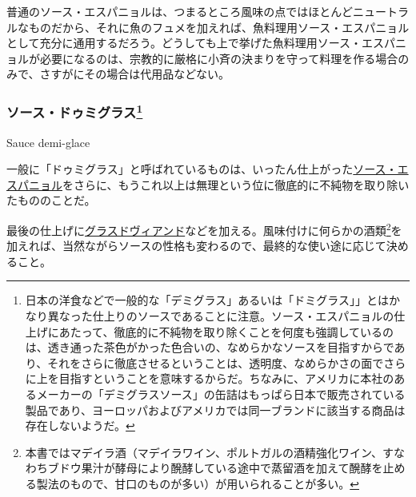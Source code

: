 \begin{recette}
普通のソース・エスパニョルは、つまるところ風味の点ではほとんどニュートラルなものだから、それに魚のフュメを加えれば、魚料理用ソース・エスパニョルとして充分に通用するだろう。どうしても上で挙げた魚料理用ソース・エスパニョルが必要になるのは、宗教的に厳格に小斉の決まりを守って料理を作る場合のみで、さすがにその場合は代用品などない。

\atoaki{}

\hypertarget{sauce-demi-glace}{%
\subsubsection[ソース・ドゥミグラス]{\texorpdfstring{ソース・ドゥミグラス\footnote{日本の洋食などで一般的な「デミグラス」あるいは「ドミグラス」」とはかなり異なった仕上りのソースであることに注意。ソース・エスパニョルの仕上げにあたって、徹底的に不純物を取り除くことを何度も強調しているのは、透き通った茶色がかった色合いの、なめらかなソースを目指すからであり、それをさらに徹底させるということは、透明度、なめらかさの面でさらに上を目指すということを意味するからだ。ちなみに、アメリカに本社のあるメーカーの「デミグラスソース」の缶詰はもっぱら日本で販売されている製品であり、ヨーロッパおよびアメリカでは同一ブランドに該当する商品は存在しないようだ。}}{ソース・ドゥミグラス}}\label{sauce-demi-glace}}

\begin{frsubenv}

Sauce demi-glace

\end{frsubenv}


一般に「ドゥミグラス」と呼ばれているものは、いったん仕上がった\protect\hyperlink{sauce-espagnole}{ソース・エスパニョル}をさらに、もうこれ以上は無理という位に徹底的に不純物を取り除いたもののことだ。

最後の仕上げに\protect\hyperlink{glace-de-viande}{グラスドヴィアンド}などを加える。風味付けに何らかの酒類\footnote{本書ではマデイラ酒（マデイラワイン、ポルトガルの酒精強化ワイン、すなわちブドウ果汁が酵母により醗酵している途中で蒸留酒を加えて醗酵を止める製法のもので、甘口のものが多い）が用いられることが多い。}を加えれば、当然ながらソースの性格も変わるので、最終的な使い途に応じて決めること。

\hypertarget{nota-sauce-demi-glace}{%
}
\end{recette}
